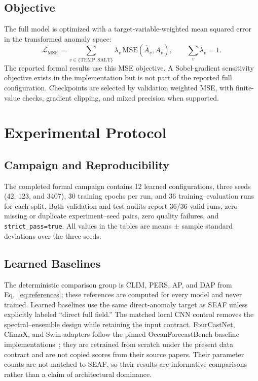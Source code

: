 \documentclass[conference]{IEEEtran}
\begin{document}
\subsection{Objective}
The full model is optimized with a target-variable-weighted mean squared error in the transformed anomaly space:
\begin{equation}
\mathcal{L}_{\mathrm{MSE}}=\sum_{v\in\{\mathrm{TEMP},\mathrm{SALT}\}}\lambda_v\,
\mathrm{MSE}(\widehat{A}_v,A_v),\qquad \sum_v\lambda_v=1.
\label{eq:loss}
\end{equation}
The reported formal results use this MSE objective. A Sobel-gradient sensitivity objective exists in the implementation but is not part of the reported full configuration. Checkpoints are selected by validation weighted MSE, with finite-value checks, gradient clipping, and mixed precision when supported.

\section{Experimental Protocol}

\subsection{Campaign and Reproducibility}
The completed formal campaign contains 12 learned configurations, three seeds (42, 123, and 3407), 30 training epochs per run, and 36 training--evaluation runs for each split. Both validation and test audits report 36/36 valid runs, zero missing or duplicate experiment--seed pairs, zero quality failures, and \texttt{strict\_pass=true}. All values in the tables are means $\pm$ sample standard deviations over the three seeds.

\subsection{Learned Baselines}
The deterministic comparison group is CLIM, PERS, AP, and DAP from Eq.~\eqref{eq:references}; these references are computed for every model and never trained. Learned baselines use the same direct-anomaly target as SEAF unless explicitly labeled ``direct full field.'' The matched local CNN control removes the spectral--ensemble design while retaining the input contract. FourCastNet, ClimaX, and Swin adapters follow the pinned OceanForecastBench baseline implementations~\cite{han2026oceanforecastbench,oceanforecastbenchCode2025}; they are retrained from scratch under the present data contract and are not copied scores from their source papers. Their parameter counts are not matched to SEAF, so their results are informative comparisons rather than a claim of architectural dominance.
\end{document}
